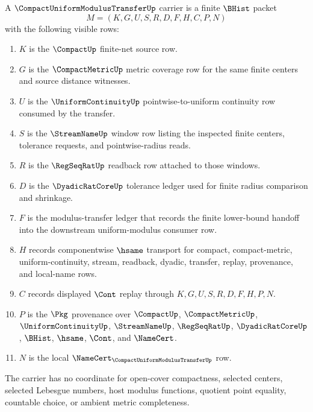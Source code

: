 \begin{definition}
\label{def:compact-uniform-modulus-transfer-carrier}
A $\CompactUniformModulusTransferUp$ carrier is a finite $\BHist$ packet
$$
M=(K,G,U,S,R,D,F,H,C,P,N)
$$
with the following visible rows:
\begin{enumerate}
\item $K$ is the $\CompactUp$ finite-net source row.
\item $G$ is the $\CompactMetricUp$ metric coverage row for the same finite centers and source distance witnesses.
\item $U$ is the $\UniformContinuityUp$ pointwise-to-uniform continuity row consumed by the transfer.
\item $S$ is the $\StreamNameUp$ window row listing the inspected finite centers, tolerance requests, and pointwise-radius reads.
\item $R$ is the $\RegSeqRatUp$ readback row attached to those windows.
\item $D$ is the $\DyadicRatCoreUp$ tolerance ledger used for finite radius comparison and shrinkage.
\item $F$ is the modulus-transfer ledger that records the finite lower-bound handoff into the downstream uniform-modulus consumer row.
\item $H$ records componentwise $\hsame$ transport for compact, compact-metric, uniform-continuity, stream, readback, dyadic, transfer, replay, provenance, and local-name rows.
\item $C$ records displayed $\Cont$ replay through $K,G,U,S,R,D,F,H,P,N$.
\item $P$ is the $\Pkg$ provenance over $\CompactUp$, $\CompactMetricUp$, $\UniformContinuityUp$, $\StreamNameUp$, $\RegSeqRatUp$, $\DyadicRatCoreUp$, $\BHist$, $\hsame$, $\Cont$, and $\NameCert$.
\item $N$ is the local $\NameCert_{\CompactUniformModulusTransferUp}$ row.
\end{enumerate}
The carrier has no coordinate for open-cover compactness, selected centers, selected Lebesgue numbers, host modulus functions, quotient point equality, countable choice, or ambient metric completeness.
\end{definition}

